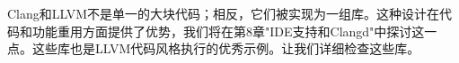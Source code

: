 Clang和LLVM不是单一的大块代码；相反，它们被实现为一组库。这种设计在代码和功能重用方面提供了优势，我们将在第8章"IDE支持和Clangd"中探讨这一点。这些库也是LLVM代码风格执行的优秀示例。让我们详细检查这些库。



































































































